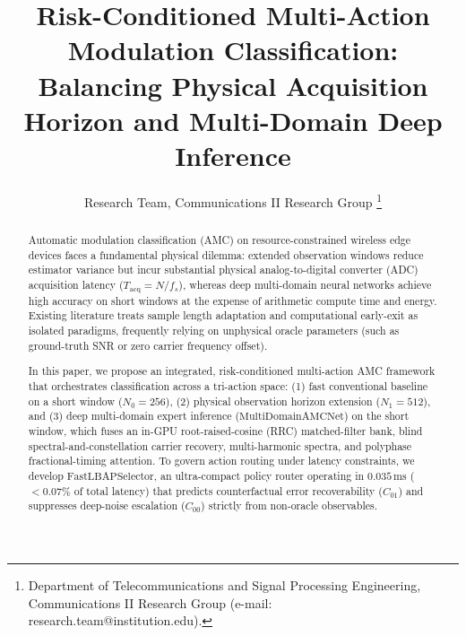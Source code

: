 \documentclass[journal]{IEEEtran}
\begin{document}
\title{Risk-Conditioned Multi-Action Modulation Classification: Balancing Physical Acquisition Horizon and Multi-Domain Deep Inference}

\author{Research Team, Communications II Research Group%
\thanks{Department of Telecommunications and Signal Processing Engineering, Communications II Research Group (e-mail: research.team@institution.edu).}}

\maketitle

\begin{abstract}
Automatic modulation classification (AMC) on resource-constrained wireless edge devices faces a fundamental physical dilemma: extended observation windows reduce estimator variance but incur substantial physical analog-to-digital converter (ADC) acquisition latency ($T_{\mathrm{acq}} = N / f_s$), whereas deep multi-domain neural networks achieve high accuracy on short windows at the expense of arithmetic compute time and energy. Existing literature treats sample length adaptation and computational early-exit as isolated paradigms, frequently relying on unphysical oracle parameters (such as ground-truth SNR or zero carrier frequency offset).

In this paper, we propose an integrated, risk-conditioned multi-action AMC framework that orchestrates classification across a tri-action space: (1) fast conventional baseline on a short window ($N_0 = 256$), (2) physical observation horizon extension ($N_1 = 512$), and (3) deep multi-domain expert inference ($\mathrm{MultiDomainAMCNet}$) on the short window, which fuses an in-GPU root-raised-cosine (RRC) matched-filter bank, blind spectral-and-constellation carrier recovery, multi-harmonic spectra, and polyphase fractional-timing attention. To govern action routing under latency constraints, we develop $\mathrm{FastLBAPSelector}$, an ultra-compact policy router operating in $0.035\,\mathrm{ms}$ ($<0.07\%$ of total latency) that predicts counterfactual error recoverability ($C_{01}$) and suppresses deep-noise escalation ($C_{00}$) strictly from non-oracle observables.


\end{abstract}
\end{document}
